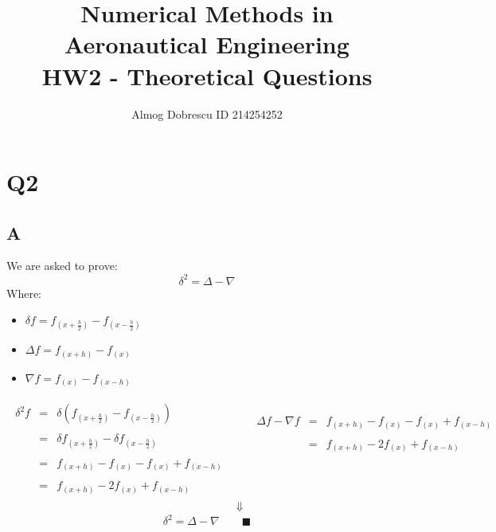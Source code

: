 \documentclass[11pt, a4paper]{article}
\title{Numerical Methods in Aeronautical Engineering \\ HW2 - Theoretical Questions}
\author{Almog Dobrescu ID 214254252}
\begin{document}
\maketitle
\thispagestyle{empty}
\newpage


\tableofcontents
\newpage

\pagestyle{fancy}
\setcounter{page}{1}

\section{Q2}
\subsection{A}
We are asked to prove:
\begin{equation}
    \delta^2=\Delta-\nabla
\end{equation}
Where:
\begin{itemize}
    \item $\delta f=f_{\left(x+\frac{h}{2}\right)}-f_{\left(x-\frac{h}{2}\right)}$
    \item $\Delta f=f_{\left(x+h\right)}-f_{\left(x\right)}$
    \item $\nabla f=f_{\left(x\right)}-f_{\left(x-h\right)}$
\end{itemize}
\begin{equation}
    \begin{matrix}
        \begin{array}{rcl}
            \delta^2f & = & \delta\left(f_{\left(x+\frac{h}{2}\right)}-f_{\left(x-\frac{h}{2}\right)}\right) \\\\
            & = & \delta f_{\left(x+\frac{h}{2}\right)}-\delta f_{\left(x-\frac{h}{2}\right)} \\\\
            & = & f_{\left(x+h\right)}-f_{\left(x\right)}-f_{\left(x\right)}+f_{\left(x-h\right)} \\\\
            & = & f_{\left(x+h\right)}-2f_{\left(x\right)}+f_{\left(x-h\right)}
        \end{array} && \begin{array}{rcl}
            \Delta f-\nabla f & = & f_{\left(x+h\right)}-f_{\left(x\right)}-f_{\left(x\right)}+f_{\left(x-h\right)} \\\\ 
            & = & f_{\left(x+h\right)}-2f_{\left(x\right)}+f_{\left(x-h\right)} \\\\
            \ \\\\
            \ \\\\
        \end{array} \\
        & \Downarrow &
    \end{matrix}
\end{equation}
\begin{equation*}
    \delta^2=\Delta-\nabla\qquad\blacksquare
\end{equation*}
\end{document}
